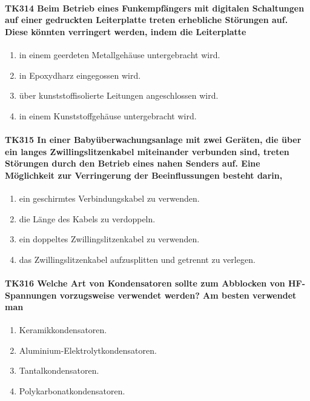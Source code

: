 \documentclass[8pt]{article}
\begin{document}
\paragraph*{TK314 Beim Betrieb eines Funkempfängers mit digitalen Schaltungen auf einer gedruckten Leiterplatte treten erhebliche Störungen auf. Diese könnten verringert werden, indem die Leiterplatte}
\begin{enumerate}[nolistsep,label=\Alph*]
\item in einem geerdeten Metallgehäuse untergebracht wird.
\item in Epoxydharz eingegossen wird. 
\item über kunststoffisolierte Leitungen angeschlossen wird.
\item in einem Kunststoffgehäuse untergebracht wird.
\end{enumerate}

\paragraph*{TK315 In einer Babyüberwachungsanlage mit zwei Geräten, die über ein langes Zwillingslitzenkabel miteinander verbunden sind, treten Störungen durch den Betrieb eines nahen Senders auf. Eine Möglichkeit zur Verringerung der Beeinflussungen besteht darin,}
\begin{enumerate}[nolistsep,label=\Alph*]
\item ein geschirmtes Verbindungskabel zu verwenden.
\item die Länge des Kabels zu verdoppeln.
\item ein doppeltes Zwillingslitzenkabel zu verwenden.
\item das Zwillingslitzenkabel aufzusplitten und getrennt zu verlegen.
\end{enumerate}

\paragraph*{TK316 Welche Art von Kondensatoren sollte zum Abblocken von HF-Spannungen vorzugsweise verwendet werden? Am besten verwendet man}
\begin{enumerate}[nolistsep,label=\Alph*]
\item Keramikkondensatoren.
\item Aluminium-Elektrolytkondensatoren.
\item Tantalkondensatoren.
\item Polykarbonatkondensatoren.
\end{enumerate}
\end{document}
